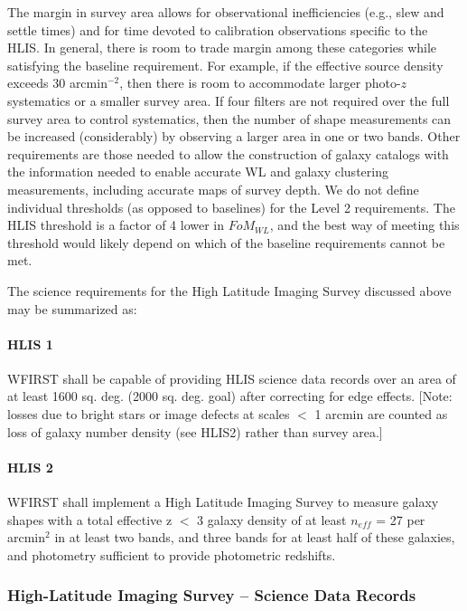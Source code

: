 The margin in survey area allows for observational inefficiencies (e.g., slew
and settle times) and for time devoted to calibration observations specific to
the HLIS. In general, there is room to trade margin among these categories while
satisfying the baseline requirement.  For example, if the effective source
density exceeds 30 arcmin$^{-2}$, then there is room to accommodate larger photo-$z$
systematics or a smaller survey area.  If four filters are not required over the
full survey area to control systematics, then the number of shape measurements
can be increased (considerably) by observing a larger area in one or two bands.
Other requirements are those needed to allow the construction of galaxy catalogs
with the information needed to enable accurate WL and galaxy clustering
measurements, including accurate maps of survey depth. We do not define
individual thresholds (as opposed to baselines) for the Level 2 requirements.
The HLIS threshold is a factor of 4 lower in $FoM_{WL}$, and the best way of meeting
this threshold would likely depend on which of the baseline requirements cannot
be met.

The science requirements for the High Latitude Imaging Survey discussed above
may be summarized as:

\paragraph{HLIS 1} WFIRST shall be capable of providing HLIS science data
records over an area of at least 1600 sq. deg. (2000 sq. deg. goal) after correcting for
edge effects. [Note: losses due to bright stars or image defects at scales $<$ 1
arcmin are counted as loss of galaxy number density (see HLIS2) rather than
survey area.]

\paragraph{HLIS 2} WFIRST shall implement a High Latitude Imaging Survey to
measure galaxy shapes with a total effective z $<$ 3 galaxy density of at least
$n_{eff}$ = 27 per arcmin$^2$ in at least two bands, and three bands for at least half
of these galaxies, and photometry sufficient to provide photometric redshifts.

\subsubsection{High-Latitude Imaging Survey – Science Data Records}

